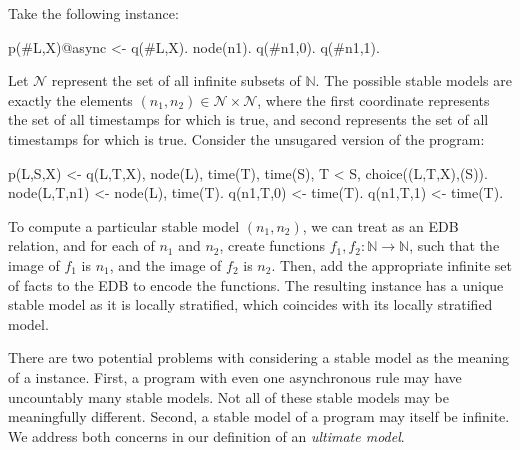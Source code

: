\begin{example}
Take the following \lang instance:

\begin{Dedalus}
p(#L,X)@async <- q(#L,X).
node(n1).
q(#n1,0).
q(#n1,1).
\end{Dedalus}

Let $\mathcal{N}$ represent the set of all infinite subsets of $\mathbb{N}$.  The possible stable models are exactly the elements $(n_1, n_2) \in \mathcal{N} \times \mathcal{N}$, where the first coordinate represents the set of all timestamps for which  is true, and second represents the set of all timestamps for which  is true.  Consider the unsugared version of the program:

\begin{Dedalus}
p(L,S,X) <- q(L,T,X), node(L), time(T), time(S), T < S, choice((L,T,X),(S)).
node(L,T,n1) <- node(L), time(T).
q(n1,T,0) <- time(T).
q(n1,T,1) <- time(T).
\end{Dedalus}

To compute a particular stable model $(n_1,n_2)$, we can treat  as an EDB relation, and for each of $n_1$ and $n_2$, create functions $f_1, f_2 : \mathbb{N} \rightarrow \mathbb{N}$, such that the image of $f_1$ is $n_1$, and the image of $f_2$ is $n_2$.  Then, add the appropriate infinite set of  facts to the EDB to encode the functions.  The resulting instance has a unique stable model as it is locally stratified, which coincides with its locally stratified model.
\end{example}

There are two potential problems with considering a stable model as the meaning of a \lang instance.  
First, a program with even one asynchronous rule may have uncountably many stable models.  
Not all of these stable models may be meaningfully different.  Second, a stable model of a \lang program may itself be infinite.  We address both concerns in our definition of an {\em ultimate model}.


